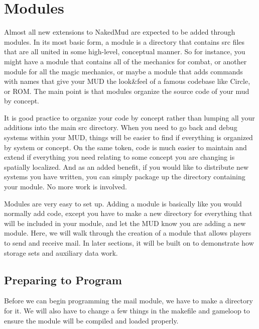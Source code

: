 \documentclass[12pt]{article}
\begin{document}
\newpage \section{Modules}
Almost all new extensions to NakedMud are expected to be added through modules. In its most basic form, a module is a directory that contains src files that are all united in some high-level, conceptual manner. So for instance, you might have a module that contains all of the mechanics for combat, or another module for all the magic mechanics, or maybe a module that adds commands with names that give your MUD the look\&feel of a famous codebase like Circle, or ROM. The main point is that modules organize the source code of your mud by concept.

It is good practice to organize your code by concept rather than lumping all your additions into the main src directory. When you need to go back and debug systems within your MUD, things will be easier to find if everything is organized by system or concept. On the same token, code is much easier to maintain and extend if everything you need relating to some concept you are changing is spatially localized. And as an added benefit, if you would like to distribute new systems you have written, you can simply package up the directory containing your module. No more work is involved.

Modules are very easy to set up. Adding a module is basically like you would normally add code, except you have to make a new directory for everything that will be included in your module, and let the MUD know you are adding a new module. Here, we will walk through the creation of a module that allows players to send and receive mail. In later sections, it will be built on to demonstrate how storage sets and auxiliary data work.



\subsection{Preparing to Program}
Before we can begin programming the mail module, we have to make a directory for it. We will also have to change a few things in the makefile and gameloop to ensure the module will be compiled and loaded properly.
\end{document}
